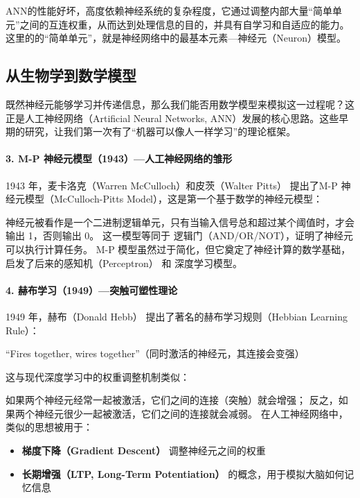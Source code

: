 ANN的性能好坏，高度依赖神经系统的复杂程度，它通过调整内部大量“简单单元”之间的互连权重，从而达到处理信息的目的，并具有自学习和自适应的能力。这里的的“简单单元”，就是神经网络中的最基本元素—神经元（Neuron）模型。


\subsection{从生物学到数学模型}

既然神经元能够学习并传递信息，那么我们能否用数学模型来模拟这一过程呢？这正是人工神经网络（Artificial Neural Networks, ANN）发展的核心思路。这些早期的研究，让我们第一次有了“机器可以像人一样学习”的理论框架。


\paragraph{3. M-P 神经元模型（1943）---人工神经网络的雏形}
1943 年，麦卡洛克（Warren McCulloch）和皮茨（Walter Pitts） 提出了M-P 神经元模型（McCulloch-Pitts Model），这是第一个基于数学的神经元模型：

神经元被看作是一个二进制逻辑单元，只有当输入信号总和超过某个阈值时，才会输出 1，否则输出 0。
这一模型等同于 逻辑门（AND/OR/NOT），证明了神经元可以执行计算任务。
M-P 模型虽然过于简化，但它奠定了神经计算的数学基础，启发了后来的感知机（Perceptron） 和 深度学习模型。



\paragraph{4. 赫布学习（1949）---突触可塑性理论}
1949 年，赫布（Donald Hebb） 提出了著名的赫布学习规则（Hebbian Learning Rule）：

“Fires together, wires together”（同时激活的神经元，其连接会变强）

这与现代深度学习中的权重调整机制类似：

如果两个神经元经常一起被激活，它们之间的连接（突触）就会增强；
反之，如果两个神经元很少一起被激活，它们之间的连接就会减弱。
在人工神经网络中，类似的思想被用于：
\begin{itemize}
\item {\bf 梯度下降（Gradient Descent）} 调整神经元之间的权重
\item {\bf 长期增强（LTP, Long-Term Potentiation）} 的概念，用于模拟大脑如何记忆信息
\end{itemize}

